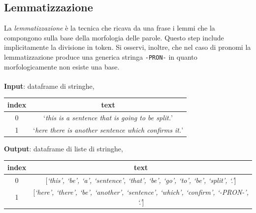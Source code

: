 \documentclass[12pt]{report}
\theoremstyle{definition}
\begin{document}
\subsection{Lemmatizzazione}
La \textit{lemmatizzazione} è la tecnica che ricava da una frase i lemmi che la compongono sulla base della morfologia delle parole.
Questo step include implicitamente la divisione in token.
Si osservi, inoltre, che nel caso di pronomi la lemmatizzazione produce una generica stringa \texttt{-PRON-} in quanto morfologicamente non esiste una base.
\\
\\
\textbf{Input}: dataframe di stringhe,
\begin{center}
    \begin{tabular}{|c|c|}
    \hline
    \textbf{index} & \textbf{text} \\
    \hline
         0 & `\textit{this is a sentence that is going to be split.}'\\
         1 & `\textit{here there is another sentence which confirms it.}'\\
    \hline
    \end{tabular}
\end{center}
\textbf{Output}: dataframe di liste di stringhe,
\begin{center}
    \begin{tabular}{|c|c|}
    \hline
    \textbf{index} & \textbf{text} \\
    \hline
         0 & [\textit{`this', `be', `a', `sentence', `that', `be', `go', `to', `be', `split', `.'}]\\
         1 & [\textit{`here', `there', `be', `another', `sentence', `which', `confirm', `-PRON-', `.'}]\\
    \hline
    \end{tabular}
\end{center}
\end{document}
